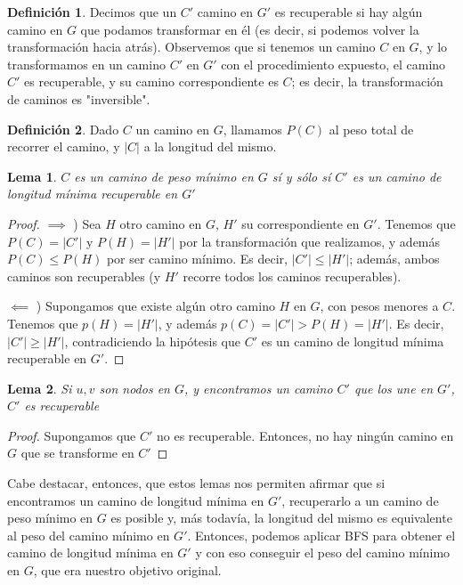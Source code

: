 \documentclass{article}
\newtheorem{lemma}{Lema}[theorem]
\theoremstyle{definition}
\newtheorem{definition}{Definición}[section]
\theoremstyle{remark}
\begin{document}
\begin{definition}
Decimos que un $C'$ camino en $G'$ es recuperable si hay algún camino en $G$ que podamos transformar en él (es decir, si podemos volver la transformación hacia atrás). Observemos que si tenemos un camino $C$ en $G$, y lo transformamos en un camino $C'$ en $G'$ con el procedimiento expuesto, el camino $C'$ es recuperable, y su camino correspondiente es $C$; es decir, la transformación de caminos es "inversible".
\end{definition}

\begin{definition}
Dado $C$ un camino en $G$, llamamos $P(C)$ al peso total de recorrer el camino, y $|C|$ a la longitud del mismo.
\end{definition}

\begin{lemma}
$C$ es un camino de peso mínimo en $G$ sí y sólo sí $C'$ es un camino de longitud mínima recuperable en $G'$
\end{lemma}

\begin{proof}

$\implies$ ) Sea $H$ otro camino en $G$, $H'$ su correspondiente en $G'$. Tenemos que $P(C) = |C'|$ y $P(H) = |H'|$ por la transformación que realizamos, y además $P(C) \leq P(H)$ por ser camino mínimo. Es decir, $|C'| \leq |H'|$; además, ambos caminos son recuperables (y $H'$ recorre todos los caminos recuperables).

$\impliedby$ ) Supongamos que existe algún otro camino $H$ en $G$, con pesos menores a $C$. Tenemos que $p(H) = |H'|$, y además $p(C) = |C'| > P(H) = |H'|$. Es decir, $|C'| \geq |H'|$, contradiciendo la hipótesis que $C'$ es un camino de longitud mínima recuperable en $G'$.
\end{proof}

\begin{lemma}
Si $u, v$ son nodos en $G$, y encontramos un camino $C'$ que los une en $G'$, $C'$ es recuperable
\end{lemma}

\begin{proof}
Supongamos que $C'$ no es recuperable. Entonces, no hay ningún camino en $G$ que se transforme en $C'$
\end{proof}

Cabe destacar, entonces, que estos lemas nos permiten afirmar que si encontramos un camino de longitud mínima en $G'$, recuperarlo a un camino de peso mínimo en $G$ es posible y, más todavía, la longitud del mismo es equivalente al peso del camino mínimo en $G'$. Entonces, podemos aplicar BFS para obtener el camino de longitud mínima en $G'$ y con eso conseguir el peso del camino mínimo en $G$, que era nuestro objetivo original.
\end{document}
